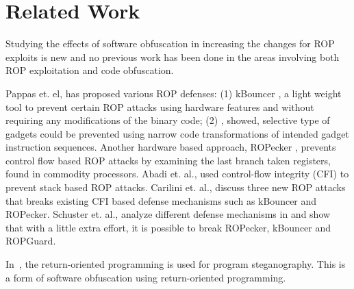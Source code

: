\section{Related Work}
\label{sec:relwork}

Studying the effects of software obfuscation in increasing the changes for ROP 
exploits is new and no previous work has been done in the areas involving both 
ROP exploitation and code obfuscation. 

Pappas et. el, has proposed various ROP defenses: (1) kBouncer 
\cite{pappas2013transparent}, a light weight tool to prevent certain ROP 
attacks using hardware features and without requiring any modifications of the 
binary code; (2) \cite{pappas2012smashing}, showed, selective type of gadgets 
could be prevented using narrow code transformations of intended gadget 
instruction sequences. Another hardware based approach, ROPecker 
\cite{cheng2014ropecker}, prevents control flow based ROP attacks by examining 
the last branch taken registers, found in commodity processors. Abadi et. al., 
\cite{abadi2005control} used control-flow integrity (CFI) to prevent stack 
based ROP attacks. Carilini et. al., \cite{carlini2014rop} discuss three new 
ROP attacks that breaks existing CFI based defense mechanisms such as kBouncer 
and ROPecker. Schuster et. al., analyze different defense mechanisms in 
\cite{schuster2014evaluating} and show that with a little extra effort, it is 
possible to break ROPecker, kBouncer and ROPGuard.

In~\cite{lu2014ropsteg}, the return-oriented programming is used for program 
steganography. This is a form of software obfuscation using return-oriented 
programming. 
